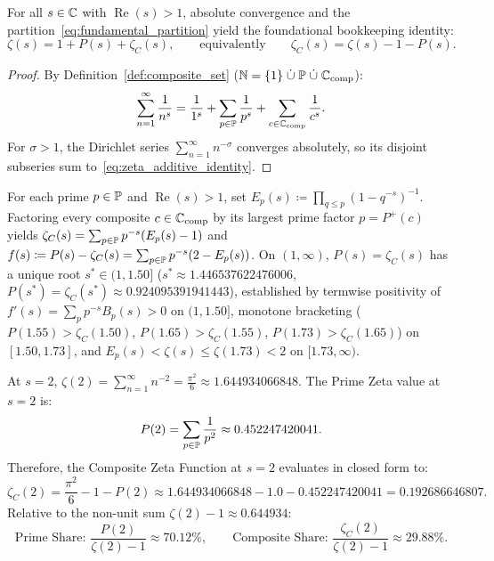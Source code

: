 \begin{proposition}
\label{thm:additive_identity}
\leanok
For all $s \in \mathbb{C}$ with $\operatorname{Re}(s) > 1$, absolute convergence and the partition~\eqref{eq:fundamental_partition} yield the foundational bookkeeping identity:
\begin{equation}
\label{eq:zeta_additive_identity}
\zeta(s) = 1 + P(s) + \zeta_C(s), \qquad \text{equivalently} \qquad \zeta_C(s) = \zeta(s) - 1 - P(s).
\end{equation}
\end{proposition}

\begin{proof}
\leanok
By Definition~\ref{def:composite_set} ($\mathbb{N} = \{1\} \;\dot{\cup}\; \mathbb{P} \;\dot{\cup}\; \mathbb{C}_{\mathrm{comp}}$):
$$\sum_{n=1}^\infty \frac{1}{n^s} = \frac{1}{1^s} + \sum_{p \in \mathbb{P}} \frac{1}{p^s} + \sum_{c \in \mathbb{C}_{\mathrm{comp}}} \frac{1}{c^s}.$$
For $\sigma > 1$, the Dirichlet series $\sum_{n=1}^\infty n^{-\sigma}$ converges absolutely, so its disjoint subseries sum to~\eqref{eq:zeta_additive_identity}.
\end{proof}

\begin{theorem}
\label{thm:smooth_cofactor_parity_uniqueness}
For each prime $p \in \mathbb{P}$ and $\operatorname{Re}(s) > 1$, set $E_p(s) \coloneqq \prod_{q \le p}(1 - q^{-s})^{-1}$. Factoring every composite $c \in \mathbb{C}_{\mathrm{comp}}$ by its largest prime factor $p = P^+(c)$ yields $\zeta_C(s) = \sum_{p \in \mathbb{P}} p^{-s}(E_p(s)-1)$ and $f(s) \coloneqq P(s) - \zeta_C(s) = \sum_{p \in \mathbb{P}} p^{-s}(2 - E_p(s))$. On $(1, \infty)$, $P(s) = \zeta_C(s)$ has a unique root $s^* \in (1, 1.50]$ ($s^* \approx 1.446537622476006$, $P(s^*) = \zeta_C(s^*) \approx 0.924095391941443$), established by termwise positivity of $f'(s) = \sum_p p^{-s} B_p(s) > 0$ on $(1, 1.50]$, monotone bracketing ($P(1.55) > \zeta_C(1.50)$, $P(1.65) > \zeta_C(1.55)$, $P(1.73) > \zeta_C(1.65)$) on $[1.50, 1.73]$, and $E_p(s) < \zeta(s) \le \zeta(1.73) < 2$ on $[1.73, \infty)$.
\end{theorem}

\begin{example}[Evaluation at the Basel Value $s = 2$]
At $s = 2$, $\zeta(2) = \sum_{n=1}^\infty n^{-2} = \frac{\pi^2}{6} \approx 1.644934066848$.
The Prime Zeta value at $s = 2$ is:
$$P(2) = \sum_{p \in \mathbb{P}} \frac{1}{p^2} \approx 0.452247420041.$$
Therefore, the Composite Zeta Function at $s = 2$ evaluates in closed form to:
\begin{equation}
\zeta_C(2) = \frac{\pi^2}{6} - 1 - P(2) \approx 1.644934066848 - 1.0 - 0.452247420041 = \mathbf{0.192686646807}.
\end{equation}
Relative to the non-unit sum $\zeta(2) - 1 \approx 0.644934$:
$$\text{Prime Share: } \frac{P(2)}{\zeta(2) - 1} \approx 70.12\%, \qquad \text{Composite Share: } \frac{\zeta_C(2)}{\zeta(2) - 1} \approx 29.88\%.$$
\end{example}

